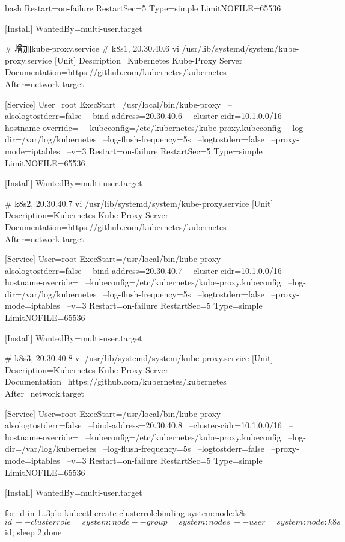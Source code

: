 \begin{outline}[enumerate]
\begin{code-in-enumerate}{bash}
Restart=on-failure
RestartSec=5
Type=simple
LimitNOFILE=65536

[Install]
WantedBy=multi-user.target

# 增加kube-proxy.service
# k8s1, 20.30.40.6
vi /usr/lib/systemd/system/kube-proxy.service
[Unit]
Description=Kubernetes Kube-Proxy Server
Documentation=https://github.com/kubernetes/kubernetes
After=network.target

[Service]
User=root
ExecStart=/usr/local/bin/kube-proxy \
    --alsologtostderr=false \
    --bind-address=20.30.40.6 \
    --cluster-cidr=10.1.0.0/16 \
    --hostname-override= \
    --kubeconfig=/etc/kubernetes/kube-proxy.kubeconfig \
    --log-dir=/var/log/kubernetes \
    --log-flush-frequency=5s \
    --logtostderr=false \
    --proxy-mode=iptables \
    --v=3
Restart=on-failure
RestartSec=5
Type=simple
LimitNOFILE=65536

[Install]
WantedBy=multi-user.target

# k8s2, 20.30.40.7
vi /usr/lib/systemd/system/kube-proxy.service
[Unit]
Description=Kubernetes Kube-Proxy Server
Documentation=https://github.com/kubernetes/kubernetes
After=network.target

[Service]
User=root
ExecStart=/usr/local/bin/kube-proxy \
    --alsologtostderr=false \
    --bind-address=20.30.40.7 \
    --cluster-cidr=10.1.0.0/16 \
    --hostname-override= \
    --kubeconfig=/etc/kubernetes/kube-proxy.kubeconfig \
    --log-dir=/var/log/kubernetes \
    --log-flush-frequency=5s \
    --logtostderr=false \
    --proxy-mode=iptables \
    --v=3
Restart=on-failure
RestartSec=5
Type=simple
LimitNOFILE=65536

[Install]
WantedBy=multi-user.target

# k8s3, 20.30.40.8
vi /usr/lib/systemd/system/kube-proxy.service
[Unit]
Description=Kubernetes Kube-Proxy Server
Documentation=https://github.com/kubernetes/kubernetes
After=network.target

[Service]
User=root
ExecStart=/usr/local/bin/kube-proxy \
    --alsologtostderr=false \
    --bind-address=20.30.40.8 \
    --cluster-cidr=10.1.0.0/16 \
    --hostname-override= \
    --kubeconfig=/etc/kubernetes/kube-proxy.kubeconfig \
    --log-dir=/var/log/kubernetes \
    --log-flush-frequency=5s \
    --logtostderr=false \
    --proxy-mode=iptables \
    --v=3
Restart=on-failure
RestartSec=5
Type=simple
LimitNOFILE=65536

[Install]
WantedBy=multi-user.target

for id in {1..3};do kubectl create clusterrolebinding system:node:k8s$id \
    --clusterrole=system:node --group=system:nodes \
    --user=system:node:k8s$id; sleep 2;done


\end{code-in-enumerate}
\end{outline}
